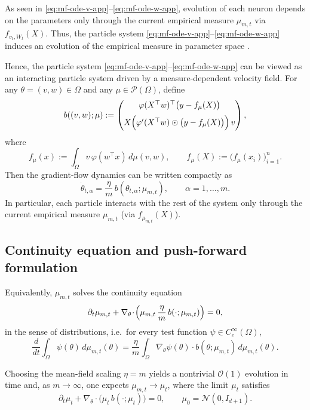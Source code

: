 As seen in \eqref{eq:mf-ode-v-app}--\eqref{eq:mf-ode-w-app}, evolution of
each neuron depends on the parameters only through the current empirical
measure $\mu_{m,t}$ via $f_{v_t,W_t}(X)$. Thus, the particle system
\eqref{eq:mf-ode-v-app}--\eqref{eq:mf-ode-w-app} induces an evolution of the
empirical measure in parameter space \citep{Mei2018meanfieldview,Rotskoff_2022}.

Hence, the particle system \eqref{eq:mf-ode-v-app}--\eqref{eq:mf-ode-w-app}
can be viewed as an interacting particle system driven by a measure-dependent
velocity field. For any $\theta=(v,w)\in\Omega$ and any $\mu\in\mathcal
	P(\Omega)$, define
\[
	b((v,w);\mu)
	:=
	\begin{pmatrix}
		\varphi(X^\top w)^\top\bigl(y-f_\mu(X)\bigr) \\[2mm]
		X\Bigl(\varphi'(X^\top w)\odot\bigl(y-f_\mu(X)\bigr)\Bigr)\,v
	\end{pmatrix},
\]
where
\[
	f_\mu(x):=\int_\Omega v\,\varphi(w^\top x)\,d\mu(v,w),
	\qquad
	f_\mu(X):=\bigl(f_\mu(x_i)\bigr)_{i=1}^n.
\]
Then the gradient-flow dynamics can be written compactly as
\[
	\dot\theta_{t,\alpha}
	=
	\frac{\eta}{m}\,b(\theta_{t,\alpha};\mu_{m,t}),
	\qquad \alpha=1,\dots,m.
\]
In particular, each particle interacts with the rest of the system only through the
current empirical measure $\mu_{m,t}$ (via $f_{\mu_{m,t}}(X)$).

\subsection{Continuity equation and push-forward formulation}\label{app:mf-continuity-equation}

Equivalently, $\mu_{m,t}$ solves the continuity equation
\begin{equation}
	\partial_t\mu_{m,t}
	+
	\nabla_\theta\!\cdot\!\Bigl(\mu_{m,t}\,\frac{\eta}{m}\,b(\cdot;\mu_{m,t})\Bigr)
	=
	0,
	\label{eq:mf-continuity-compact-app}
\end{equation}
in the sense of distributions, i.e.\ for every test function
$\psi\in C_c^\infty(\Omega)$,
\[
	\frac{d}{dt}\int_\Omega \psi(\theta)\,d\mu_{m,t}(\theta)
	=
	\frac{\eta}{m}\int_\Omega \nabla_\theta\psi(\theta)\cdot b(\theta;\mu_{m,t})\,d\mu_{m,t}(\theta).
\]

Choosing the mean-field scaling $\eta=m$ yields a nontrivial $\mathcal O(1)$
evolution in time and, as $m\to\infty$, one expects $\mu_{m,t} \to \mu_t$,
where the limit $\mu_t$ satisfies
\begin{equation}
	\partial_t\mu_t+\nabla_\theta\!\cdot\bigl(\mu_t\,b(\cdot;\mu_t)\bigr)=0,
	\qquad \mu_0=\mathcal N (0,I_{d+1}).
	\label{eq:mf-continuity-with-initial-conditions-app}
\end{equation}

